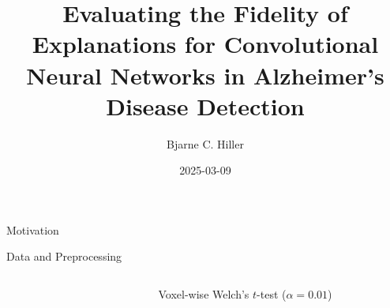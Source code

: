 \documentclass[aspectratio=169,xcolor={table, dvipsnames}]{beamer}
\title[Fidelity of Explanations for AD Classification from MRI]{Evaluating the Fidelity of Explanations for Convolutional Neural Networks in Alzheimer’s Disease Detection}
\author[Hiller]{Bjarne C. Hiller}
\date{2025-03-09}
\institute[Uni Rostock]{University of Rostock}
\begin{document}
\maketitle


\begin{frame}{Motivation}

\end{frame}
\begin{frame}{Data and Preprocessing}
	\begin{columns}
		\begin{column}{0.5\textwidth}
			\begin{figure}
				
			\end{figure}
		\end{column}
		\begin{column}{0.5\textwidth}
			\begin{figure}
				\caption*{Voxel-wise Welch's $t$-test ($\alpha = 0.01$)}\label{fig:ttest}
			\end{figure}
		\end{column}
	\end{columns}
\end{frame}
\end{document}
